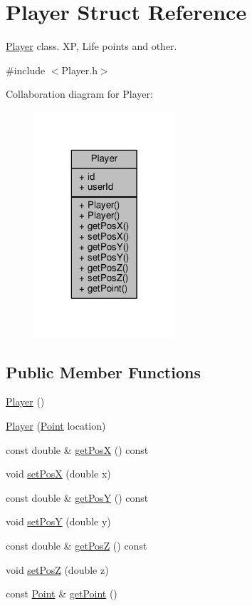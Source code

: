 \hypertarget{struct_player}{\section{Player Struct Reference}
\label{struct_player}
}


\hyperlink{struct_player}{Player} class. X\-P, Life points and other.  




{\ttfamily \#include $<$Player.\-h$>$}



Collaboration diagram for Player\-:
\nopagebreak
\begin{figure}[H]
\begin{center}
\leavevmode
\includegraphics[width=148pt]{struct_player__coll__graph}
\end{center}
\end{figure}
\subsection*{Public Member Functions}
\begin{DoxyCompactItemize}
\item 
\hyperlink{struct_player_affe0cc3cb714f6deb4e62f0c0d3f1fd8}{Player} ()
\item 
\hyperlink{struct_player_ad1c9500a9f02f1055209e1d0e33e27e5}{Player} (\hyperlink{struct_point}{Point} location)
\item 
const double \& \hyperlink{struct_player_a34371ed01e0f407e8b3dd47d5eb6a248}{get\-Pos\-X} () const 
\item 
void \hyperlink{struct_player_ae5aa5be871fe72f9020980ad83f963c1}{set\-Pos\-X} (double x)
\item 
const double \& \hyperlink{struct_player_a79192b1280def72414767ed9cb15f9ce}{get\-Pos\-Y} () const 
\item 
void \hyperlink{struct_player_ab7214ba1c1d38aeb5676a8cf9f5473fe}{set\-Pos\-Y} (double y)
\item 
const double \& \hyperlink{struct_player_a08fa9b861a53c027a49e709c32577fe7}{get\-Pos\-Z} () const 
\item 
void \hyperlink{struct_player_a265ea0b3d9627fb6f9e65dfb3aed66f7}{set\-Pos\-Z} (double z)
\item 
const \hyperlink{struct_point}{Point} \& \hyperlink{struct_player_a46ea235260e1fee6f208e4bf3c82b25b}{get\-Point} ()
\end{DoxyCompactItemize}
